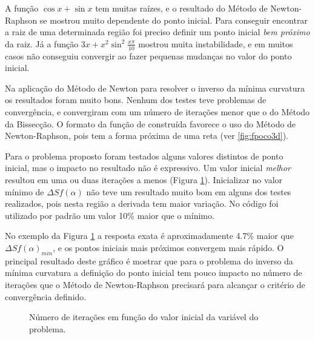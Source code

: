 \documentclass[final,5p]{elsarticle}
\numberwithin{equation}{section}
\begin{document}
    A função $\cos x + \sin x$ tem muitas raízes, e o resultado do Método de Newton-Raphson se mostrou muito dependente do ponto inicial. Para conseguir encontrar a raiz de uma determinada região foi preciso definir um ponto inicial \emph{bem próximo} da raiz. Já a função $3x + x^2 \sin^2 \frac{x\pi}{10}$ mostrou muita instabilidade, e em muitos casos não conseguiu convergir ao fazer pequenas mudanças no valor do ponto inicial.

    Na aplicação do Método de Newton para resolver o inverso da mínima curvatura os resultados foram muito bons. Nenhum dos testes teve problemas de convergência, e convergiram com um número de iterações menor que o do Método da Bissecção. O formato da função de construída favorece o uso do Método de Newton-Raphson, pois tem a forma próxima de uma reta (ver \ref{fig:fpoco3d}).

    Para o problema proposto foram testados alguns valores distintos de ponto inicial, mas o impacto no resultado não é expressivo. Um valor inicial \emph{melhor} resultou em uma ou duas iterações a menos (Figura \ref{fig:pontoinicial}). Inicializar no valor mínimo de $\Delta S f(\alpha)$ não teve um resultado muito bom em alguns dos testes realizados, pois nesta região a derivada tem maior variação. No código foi utilizado por padrão um valor 10\% maior que o mínimo. 

    No exemplo da Figura \ref{fig:pontoinicial} a resposta exata é aproximadamente 4.7\% maior que $\Delta S f(\alpha)_{min}$, e os pontos iniciais mais próximos convergem mais rápido. O principal resultado deste gráfico é mostrar que para o problema do inverso da mínima curvatura a definição do ponto inicial tem pouco impacto no número de iterações que o Método de Newton-Raphson precisará para alcançar o critério de convergência definido. 

    \begin{figure}[hbt!]
        \label{fig:pontoinicial}
        \centering
        \caption{Número de iterações em função do valor inicial da variável do problema.}
    \end{figure}
\end{document}
